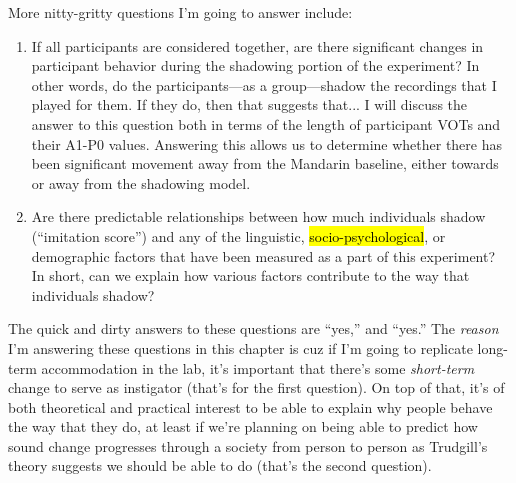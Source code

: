 More nitty-gritty questions I'm going to answer include:
\begin{enumerate}
\item If all participants are considered together, are there significant changes in participant behavior during the shadowing portion of the experiment? In other words, do the participants---as a group---shadow the recordings that I played for them. If they do, then that suggests that... I will discuss the answer to this question both in terms of the length of participant VOTs and their A1-P0 values. Answering this allows us to determine whether there has been significant movement away from the Mandarin baseline, either towards or away from the shadowing model.
\item Are there predictable relationships between how much individuals shadow (``imitation score'')%
and any of the linguistic, \hl{socio-psychological}, or demographic factors that have been measured as a part of this experiment? In short, can we explain how various factors contribute to the way that individuals shadow?%
\end{enumerate}
The quick and dirty answers to these questions are ``yes,'' and ``yes.'' %
The \textit{reason} I'm answering these questions in this chapter is cuz if I'm going to replicate long-term accommodation \citep{trudgill1986dialects} in the lab, it's important that there's some \textit{short-term} change to serve as instigator (that's for the first question). On top of that, it's of both theoretical and practical interest to be able to explain why %
people behave the way that they do, at least if we're planning on being able to predict how sound change progresses through a society from person to person as Trudgill's theory suggests we should be able to do (that's the second question).%


